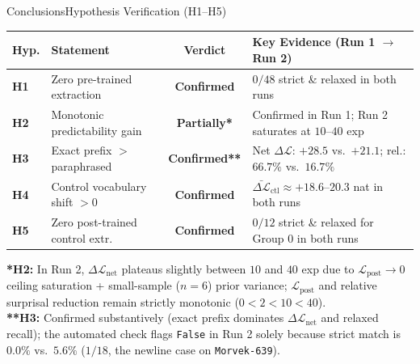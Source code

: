 \documentclass[10pt,aspectratio=43
	]{beamer}
\begin{document}
    \begin{frame}{Conclusions}{Hypothesis Verification (H1--H5)}
        \begin{table}
            \centering
            \scriptsize
            \begin{tabular}{llcl}
                \toprule
                \textbf{Hyp.} & \textbf{Statement} & \textbf{Verdict} & \textbf{Key Evidence (Run 1 $\to$ Run 2)} \\
                \midrule
                \textbf{H1} & Zero pre-trained extraction & \textbf{Confirmed} & $0/48$ strict \& relaxed in both runs \\
                \textbf{H2} & Monotonic predictability gain & \textbf{Partially*} & Confirmed in Run 1; Run 2 saturates at $10$--$40$ exp \\
                \textbf{H3} & Exact prefix $>$ paraphrased & \textbf{Confirmed**} & Net $\Delta\mathcal{L}$: $+28.5$ vs.\ $+21.1$; rel.: $66.7\%$ vs.\ $16.7\%$ \\
                \textbf{H4} & Control vocabulary shift $> 0$ & \textbf{Confirmed} & $\bar{\Delta\mathcal{L}}_{\text{ctl}} \approx +18.6$--$20.3$ nat in both runs \\
                \textbf{H5} & Zero post-trained control extr. & \textbf{Confirmed} & $0/12$ strict \& relaxed for Group 0 in both runs \\
                \bottomrule
            \end{tabular}
        \end{table}
        \vspace{0.08cm}
        \scriptsize
        \textbf{*H2:} In Run 2, $\Delta\mathcal{L}_{\text{net}}$ plateaus slightly between $10$ and $40$ exp due to $\mathcal{L}_{\text{post}} \to 0$ ceiling saturation + small-sample ($n=6$) prior variance; $\mathcal{L}_{\text{post}}$ and relative surprisal reduction remain strictly monotonic ($0 < 2 < 10 < 40$).\\
        \textbf{**H3:} Confirmed substantively (exact prefix dominates $\Delta\mathcal{L}_{\text{net}}$ and relaxed recall); the automated check flags \texttt{False} in Run 2 solely because strict match is $0.0\%$ vs.\ $5.6\%$ ($1/18$, the newline case on \texttt{Morvek-639}).
    \end{frame}
\end{document}
